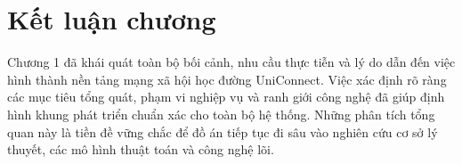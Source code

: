 \section{Kết luận chương}

Chương 1 đã khái quát toàn bộ bối cảnh, nhu cầu thực tiễn và lý do dẫn đến việc hình thành nền tảng mạng xã hội học đường UniConnect. Việc xác định rõ ràng các mục tiêu tổng quát, phạm vi nghiệp vụ và ranh giới công nghệ đã giúp định hình khung phát triển chuẩn xác cho toàn bộ hệ thống. Những phân tích tổng quan này là tiền đề vững chắc để đồ án tiếp tục đi sâu vào nghiên cứu cơ sở lý thuyết, các mô hình thuật toán và công nghệ lõi.


